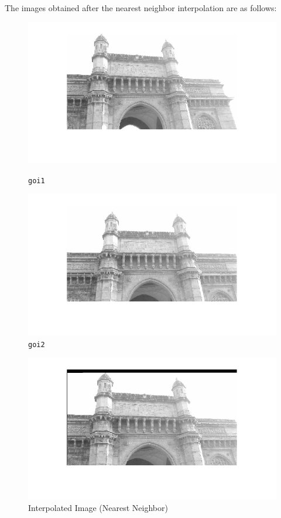 \documentclass{article}
\begin{document}
The images obtained after the nearest neighbor interpolation are as follows:
\begin{figure}[htbp]
    \centering
    \begin{minipage}[b]{0.45\textwidth}
        \includegraphics[width=\textwidth]{./Q6/nn_im1.png}
        \caption{\texttt{goi1}}
    \end{minipage}
    \begin{minipage}[b]{0.45\textwidth}
        \includegraphics[width=\textwidth]{./Q6/nn_im2.png}
        \caption{\texttt{goi2}}
    \end{minipage}
\end{figure}
\begin{figure}[!htb]
    \includegraphics[width=\textwidth]{./Q6/nn_im3.png}
    \caption{Interpolated Image (Nearest Neighbor)}
\end{figure}
\end{document}
